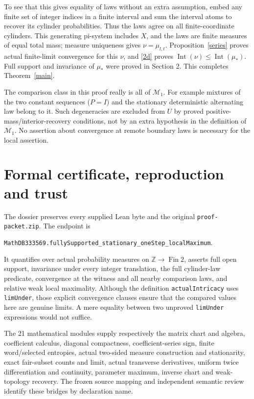 \documentclass[11pt]{article}
\newcommand{\Int}{\operatorname{Int}}
\begin{document}
To see that this gives equality of laws without an extra assumption, embed any finite set of integer indices in a finite interval and sum the interval atoms to recover its cylinder probabilities. Thus the laws agree on all finite-coordinate cylinders. This generating pi-system includes $X$, and the laws are finite measures of equal total mass; measure uniqueness gives $\nu=\mu_{l,t}$. Proposition~\ref{series} proves actual finite-limit convergence for this $\nu$, and \eqref{2d} proves $\Int(\nu)\leq\Int(\mu_*)$. Full support and invariance of $\mu_*$ were proved in Section 2. This completes Theorem~\ref{main}.

The comparison class in this proof really is all of $\mathcal M_1$. For example mixtures of the two constant sequences ($P=I$) and the stationary deterministic alternating law belong to it. Such degeneracies are excluded from $U$ by proved positive-mass/interior-recovery conditions, not by an extra hypothesis in the definition of $\mathcal M_1$. No assertion about convergence at remote boundary laws is necessary for the local assertion.

\section{Formal certificate, reproduction and trust}
The dossier preserves every supplied Lean byte and the original
\texttt{proof-packet.zip}. The endpoint is
\begin{center}\small\texttt{MathDB333569.fullySupported\_stationary\_oneStep\_localMaximum}.\end{center}
It quantifies over actual probability measures on $\mathbb Z\to\operatorname{Fin}2$, asserts full open support, invariance under every integer translation, the full cylinder-law predicate, convergence at the witness and all nearby comparison laws, and relative weak local maximality. Although the definition \texttt{actualIntricacy} uses \texttt{limUnder}, those explicit convergence clauses ensure that the compared values here are genuine limits. A mere equality between two unproved \texttt{limUnder} expressions would not suffice.

The 21 mathematical modules supply respectively the matrix chart and algebra, coefficient calculus, diagonal compactness, coefficient-series sign, finite word/selected entropies, actual two-sided measure construction and stationarity, exact fair-subset counts and limit, actual transverse derivatives, uniform twice differentiation and continuity, parameter maximum, inverse chart and weak-topology recovery. The frozen source mapping and independent semantic review identify these bridges by declaration name.
\end{document}
